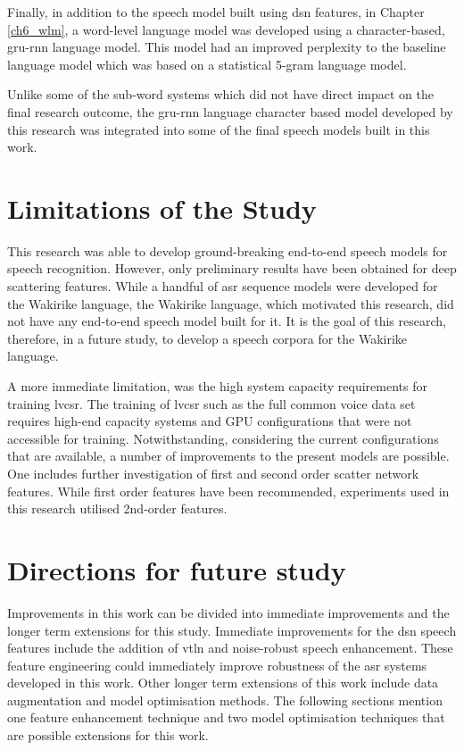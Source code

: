 Finally, in addition to the speech model built using \acrshort{dsn} features, in Chapter \ref{ch6_wlm}, a word-level language model was developed using a character-based, \acrshort{gru}-\acrshort{rnn} language model.  This model had an improved perplexity to the baseline language model which was based on a statistical 5-gram language model.

Unlike some of the sub-word systems which did not have direct impact on the final research outcome, the \acrshort{gru}-\acrshort{rnn} language character based model developed by this research was integrated into some of the final speech models built in this work.

\section{Limitations of the Study}
This research was able to develop ground-breaking end-to-end speech models for speech recognition. However, only preliminary results have been obtained for deep scattering features.  While a handful of \acrshort{asr} sequence models were developed for the Wakirike language, the Wakirike language, which motivated this research, did not have any end-to-end speech model built for it.  It is the goal of this research, therefore,  in a future study, to develop a speech corpora for the Wakirike language.

A more immediate limitation, was the high system capacity requirements for training \acrlong{lvcsr}.  The training of \acrshort{lvcsr} such as the full common voice data set requires high-end capacity systems and GPU configurations that were not accessible for training.  Notwithstanding, considering the current configurations that are available, a number of improvements to the present models are possible.    One includes further investigation of first and second order scatter network features. While first order features have been recommended, experiments used in this research utilised 2nd-order features.

\stopblue

\section{Directions for future study}
Improvements in this work can be divided into immediate improvements and the longer term extensions for this study.  Immediate improvements for the \acrshort{dsn} speech features include the addition of \acrfull{vtln} and noise-robust speech enhancement.  These feature engineering could immediately improve robustness of the \acrshort{asr} systems developed in this work. Other longer term extensions of this work include data augmentation and model optimisation methods. The following sections mention one feature enhancement technique and two model optimisation techniques that are possible extensions for this work. 

